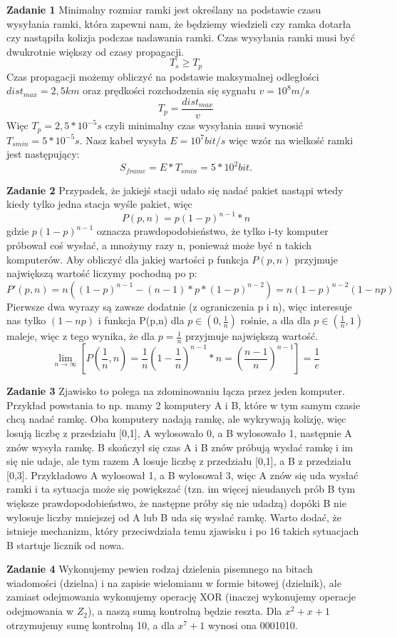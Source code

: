 \documentclass[12pt,a4paper]{article}
\newcommand{\zadanie}[1]{\par\textbf{Zadanie #1}}
\begin{document}
\zadanie{1}
Minimalny rozmiar ramki jest określany na podstawie czasu wysyłania ramki, która zapewni nam, że będziemy wiedzieli czy ramka dotarła czy nastąpiła kolizja podczas nadawania ramki. Czas wysyłania ramki musi być dwukrotnie większy od czasy propagacji.
$$T_{s} \geq T_{p}$$
Czas propagacji możemy obliczyć na podstawie maksymalnej odległości $dist_{max} = 2,5km$ oraz prędkości rozchodzenia się sygnału $v = 10^{8}m/s$
$$T_{p} = \frac{dist_{max}}{v}$$
Więc $T_{p} = 2,5 * 10^{-5}s$ czyli minimalny czas wysyłania musi wynosić $T_{smin} = 5 * 10^{-5}s$.
Nasz kabel wysyła $E = 10^{7} bit/s$ więc wzór na wielkość ramki jest następujący:
$$S_{frame} = E * T_{smin} = 5*10^{2} bit.$$

\zadanie{2}
Przypadek, że jakiejś stacji udało się nadać pakiet nastąpi wtedy kiedy tylko jedna stacja wyśle pakiet, więc
$$P(p,n) = p(1-p)^{n-1} * n$$
gdzie $p(1-p)^{n-1}$ oznacza prawdopodobieństwo, że tylko i-ty komputer próbował coś wysłać, a mnożymy razy n, ponieważ może być n takich komputerów.
Aby obliczyć dla jakiej wartości p funkcja $P(p,n)$ przyjmuje największą wartość liczymy pochodną po p:
$$P'(p,n) = n((1-p)^{n-1} - (n-1) * p * (1-p)^{n-2}) = n(1-p)^{n-2}(1 - np)$$
Pierwsze dwa wyrazy są zawsze dodatnie (z ograniczenia p i n), więc interesuje nas tylko $(1-np)$ i funkcja P(p,n) dla $p \in (0, \frac{1}{n})$ rośnie, a dla dla $p \in (\frac{1}{n}, 1)$ maleje, więc z tego wynika, że dla $p = \frac{1}{n}$ przyjmuje największą wartość.
$$\lim_{n \to \infty}[P(\frac{1}{n}, n) = \frac{1}{n}(1-\frac{1}{n})^{n-1} * n = (\frac{n-1}{n})^{n-1}] = \frac{1}{e}$$

\zadanie{3}
Zjawisko to polega na zdominowaniu łącza przez jeden komputer. Przykład powstania to np. mamy 2 komputery A i B, które w tym samym czasie chcą nadać ramkę. Oba komputery nadają ramkę, ale wykrywają kolizję, więc losują liczbę z przedziału [0,1], A wylosowało 0, a B wylosowało 1, następnie A znów wysyła ramkę. B skończył się czas A i B znów próbują wysłać ramkę i im się nie udaje, ale tym razem A losuje liczbę z przedziału [0,1], a B z przedziału [0,3]. Przykładowo A wylosował 1, a B wylosował 3, więc A znów się uda wysłać ramki i ta sytuacja może się powiększać (tzn. im więcej nieudanych prób B tym większe prawdopodobieństwo, że następne próby się nie udadzą) dopóki B nie wylosuje liczby mniejszej od A lub B uda się wysłać ramkę. Warto dodać, że istnieje mechanizm, który przeciwdziała temu zjawisku i po 16 takich sytuacjach B startuje licznik od nowa.

\zadanie{4}
Wykonujemy pewien rodzaj dzielenia pisemnego na bitach wiadomości (dzielna) i na zapisie wielomianu w formie bitowej (dzielnik), ale zamiast odejmowania wykonujemy operację XOR (inaczej wykonujemy operacje odejmowania w $Z_2$), a naszą sumą kontrolną będzie reszta. Dla $x^2+x+1$ otrzymujemy sumę kontrolną 10, a dla $x^7+1$ wynosi ona 0001010.
\end{document}
